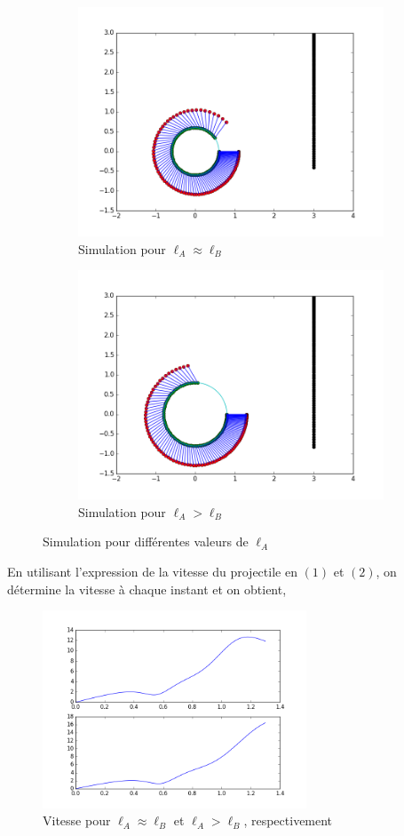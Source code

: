 \documentclass[10pt]{article}
\begin{document}
\begin{figure}[h]
\centering
\begin{subfigure}{0.4\textwidth}
 \includegraphics[width=\textwidth]{figure_3.png}
 \caption{Simulation pour $\ell_A \approx \ell_B$}
\end{subfigure}
\begin{subfigure}{0.4\textwidth}
 \includegraphics[width=\textwidth]{figure_4.png}
 \caption{Simulation pour $\ell_A > \ell_B$}
\end{subfigure}
\caption{Simulation pour différentes valeurs de $\ell_A$}
\end{figure}
En utilisant l'expression de la vitesse du projectile en $(1)$ et $(2)$, on détermine la vitesse à chaque instant et on obtient,

\begin{figure}[h]
\centering
  \includegraphics[width=0.7\textwidth]{figure_5.png}
  \caption{Vitesse pour $\ell_A \approx \ell_B$ et $\ell_A > \ell_B$, respectivement}
\end{figure}
\end{document}
